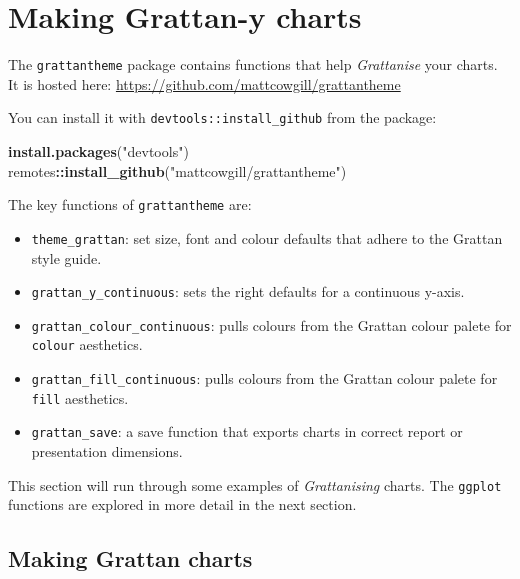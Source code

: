 \documentclass[]{book}
\newenvironment{Shaded}{\begin{snugshade}}{\end{snugshade}}
\newcommand{\KeywordTok}[1]{\textcolor[rgb]{0.13,0.29,0.53}{\textbf{#1}}}
\newcommand{\NormalTok}[1]{#1}
\newcommand{\OperatorTok}[1]{\textcolor[rgb]{0.81,0.36,0.00}{\textbf{#1}}}
\newcommand{\StringTok}[1]{\textcolor[rgb]{0.31,0.60,0.02}{#1}}
\providecommand{\tightlist}{%
  \setlength{\itemsep}{0pt}\setlength{\parskip}{0pt}}
\begin{document}
\hypertarget{making-grattan-y-charts}{%
\section{Making Grattan-y charts}\label{making-grattan-y-charts}}

The \texttt{grattantheme} package contains functions that help \emph{Grattanise} your charts. It is hosted here: \url{https://github.com/mattcowgill/grattantheme}

You can install it with \texttt{devtools::install\_github} from the package:

\begin{Shaded}
\begin{Highlighting}[]
\KeywordTok{install.packages}\NormalTok{(}\StringTok{"devtools"}\NormalTok{)}
\NormalTok{remotes}\OperatorTok{::}\KeywordTok{install_github}\NormalTok{(}\StringTok{"mattcowgill/grattantheme"}\NormalTok{)}
\end{Highlighting}
\end{Shaded}

The key functions of \texttt{grattantheme} are:

\begin{itemize}
\tightlist
\item
  \texttt{theme\_grattan}: set size, font and colour defaults that adhere to the Grattan style guide.
\item
  \texttt{grattan\_y\_continuous}: sets the right defaults for a continuous y-axis.
\item
  \texttt{grattan\_colour\_continuous}: pulls colours from the Grattan colour palete for \texttt{colour} aesthetics.
\item
  \texttt{grattan\_fill\_continuous}: pulls colours from the Grattan colour palete for \texttt{fill} aesthetics.
\item
  \texttt{grattan\_save}: a save function that exports charts in correct report or presentation dimensions.
\end{itemize}

This section will run through some examples of \emph{Grattanising} charts. The \texttt{ggplot} functions are explored in more detail in the next section.

\hypertarget{making-grattan-charts}{%
\subsection{Making Grattan charts}\label{making-grattan-charts}}
\end{document}
